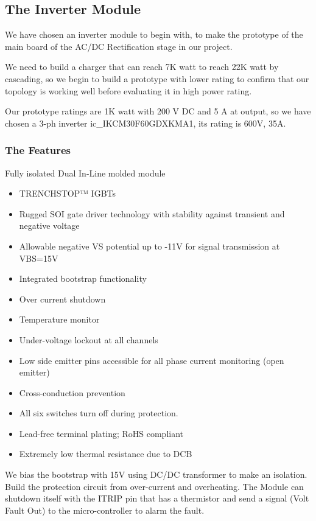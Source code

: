 \documentclass[12pt,a4paper]{book}
\begin{document}
\subsection{The Inverter Module}
We have chosen an inverter module to begin with, to make the prototype of the main board of the AC/DC Rectification stage in our project.

We need to build a charger that can reach 7K watt to reach 22K watt by cascading, so we begin to build a prototype with lower rating to confirm that our topology is working well before evaluating it in high power rating.

Our prototype ratings are 1K watt with 200 V DC and 5 A at output, so we have chosen a 3-ph inverter ic\_IKCM30F60GDXKMA1, its rating is 600V, 35A.

\subsubsection{The Features}
Fully isolated Dual In-Line molded module
\begin{itemize}
  \item TRENCHSTOP™ IGBTs
  \item	Rugged SOI gate driver technology with stability against transient and negative voltage
  \item	Allowable negative VS potential up to -11V for signal transmission at VBS=15V
  \item	Integrated bootstrap functionality
  \item	Over current shutdown
  \item	Temperature monitor
  \item	Under-voltage lockout at all channels
  \item	Low side emitter pins accessible for all phase current monitoring (open emitter)
  \item	Cross-conduction prevention
  \item	All six switches turn off during protection.
  \item	Lead-free terminal plating; RoHS compliant
  \item	Extremely low thermal resistance due to DCB
\end{itemize}
We bias the bootstrap with 15V using DC/DC transformer to make an isolation. Build the protection circuit from over-current and overheating. The Module can shutdown itself with the ITRIP pin that has a thermistor and send a signal (Volt Fault Out) to the micro-controller to alarm the fault.
\end{document}
